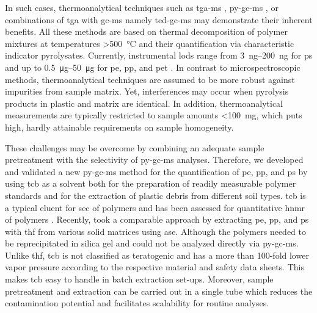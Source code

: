 In such cases, thermoanalytical techniques such as \ac{tga-ms} \citep[Chapter~\ref{ch:tga-ms-method};][]{DavidIntroducing2019}, \ac{py-gc-ms} \citep{FischerSimultaneous2017,FischerMicroplastics2019}, or combinations of \ac{tga} with \acs{gc-ms} namely \ac{ted-gc-ms} \citep{DumichenAnalysis2015,DuemichenAutomated2019} may demonstrate their inherent benefits. All these methods are based on thermal decomposition of polymer mixtures at temperatures \SI{>500}{\degreeCelsius} and their quantification via characteristic indicator pyrolysates. Currently, instrumental \acp{lod} range from \SIrange[range-phrase = { to }]{3}{200}{\nano\gram} for \ac{ps} \citep{FischerMicroplastics2019,DuemichenAutomated2019} and up to \SIrange{0.5}{50}{\micro\gram} for \ac{pe}, \ac{pp}, and \ac{pet} \citep[Chapter~\ref{ch:tga-ms-method};][]{DuemichenAutomated2019}. In contrast to microspectroscopic methods, thermoanalytical techniques are assumed to be more robust against impurities from sample matrix. Yet, interferences may occur when pyrolysis products in plastic and matrix are identical. In addition, thermoanalytical measurements are typically restricted to sample amounts \SI{<100}{\milli\gram}, which puts high, hardly attainable requirements on sample homogeneity.

These challenges may be overcome by combining an adequate sample pretreatment with the selectivity of \ac{py-gc-ms} analyses. Therefore, we developed and validated a new \ac{py-gc-ms} method for the quantification of \ac{pe}, \ac{pp}, and \ac{ps} by using \ac{tcb} as a solvent both for the preparation of readily measurable polymer standards and for the extraction of plastic debris from different soil types. \Ac{tcb} is a typical eluent for \ac{sec} of polymers \citep{BivensPolymertoSolvent2016} and has been assessed for quantitative \ac{hnmr} of polymers \citep{PeezFirst2019}. Recently, \citet{DierkesQuantification2019} took a comparable approach by extracting \ac{pe}, \ac{pp}, and \ac{ps} with \ac{thf} from various solid matrices using \ac{ase}. Although the polymers needed to be reprecipitated in silica gel and could not be analyzed directly via \ac{py-gc-ms}. Unlike \ac{thf}, \ac{tcb} is not classified as teratogenic and has a more than 100-fold lower vapor pressure according to the respective material and safety data sheets. This makes \ac{tcb} easy to handle in batch extraction set-ups. Moreover, sample pretreatment and extraction can be carried out in a single tube which reduces the contamination potential and facilitates scalability for routine analyses.

